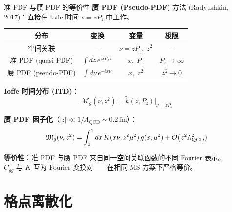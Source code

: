 \documentclass[10pt,aspectratio=169]{beamer}
\newcommand{\msbar}{\overline{\mathrm{MS}}}
\newcommand{\lqcd}{\Lambda_{\mathrm{QCD}}}
\newcommand{\fm}{\,\mathrm{fm}}
\newcommand{\Pz}{P_z}
\begin{document}
\begin{frame}{准 PDF 与赝 PDF 的等价性}
\small
\textbf{赝 PDF (Pseudo-PDF)} 方法 (Radyushkin, 2017)：直接在 Ioffe 时间 $\nu = z\Pz$ 中工作。

\begin{center}
\begin{tabular}{c|c|c|c}
  \toprule
  \textbf{分布} & \textbf{变换} & \textbf{变量} & \textbf{极限} \\
  \midrule
  空间关联 & — & $\nu = z\Pz,\; z^2$ & — \\
  准 PDF (quasi-PDF) & $\int dz\, e^{i x \Pz z}$ & $x,\; \Pz$ & $\Pz \to \infty$ \\
  赝 PDF (pseudo-PDF) & $\int d\nu\, e^{-i x \nu}$ & $x,\; z^2$ & $z^2 \to 0$ \\
  \bottomrule
\end{tabular}
\end{center}

\textbf{Ioffe 时间分布 (ITD)}：
\begin{equation}
  \mathcal{M}_g(\nu, z^2) = \tilde{h}(z, \Pz)\big|_{\nu = z\Pz}
\end{equation}

\textbf{赝 PDF 因子化}（$|z| \ll 1/\lqcd \sim 0.2\fm$）：
\begin{equation}
  \mathfrak{M}_g(\nu, z^2) = \int_0^1 dx\, K(x\nu, z^2\mu^2)\, g(x,\mu^2) + \order{z^2\lqcd^2}
\end{equation}

\textbf{等价性}：准 PDF 与赝 PDF 来自同一空间关联函数的不同 Fourier 表示。\\
$C_{gg}$ 与 $K$ 互为 Fourier 变换对——在相同 $\msbar$ 方案下严格等价。
\end{frame}

\section{格点离散化}
\end{document}
